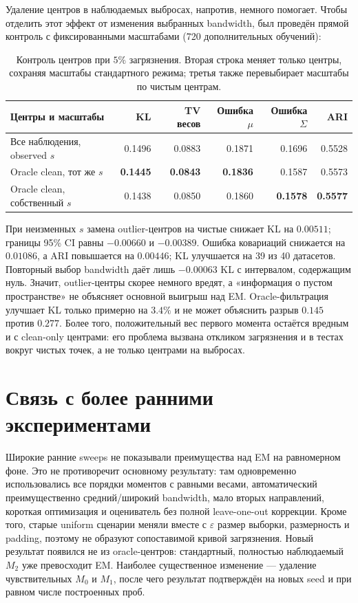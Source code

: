 \documentclass[11pt,a4paper]{article}
\newcommand{\best}[1]{\textbf{\color{green}#1}}
\newcommand{\Mzero}{M_0}
\newcommand{\Mone}{M_1}
\newcommand{\Mtwo}{M_2}
\begin{document}
Удаление центров в наблюдаемых выбросах, напротив, немного помогает. Чтобы
отделить этот эффект от изменения выбранных bandwidth, был проведён прямой
контроль с фиксированными масштабами (720 дополнительных обучений):

\begin{table}[ht]
\centering
\small
\caption{Контроль центров при $5\%$ загрязнения. Вторая строка меняет только
центры, сохраняя масштабы стандартного режима; третья также перевыбирает
масштабы по чистым центрам.}
\label{tab:centers}
\begin{tabularx}{\linewidth}{@{}Yrrrrr@{}}
\toprule
Центры и масштабы & KL & TV весов & Ошибка $\mu$ & Ошибка $\Sigma$ & ARI \\
\midrule
Все наблюдения, observed $s$ & 0.1496 & 0.0883 & 0.1871 & 0.1696 & 0.5528 \\
Oracle clean, тот же $s$ & \best{0.1445} & \best{0.0843} & \best{0.1836} & 0.1587 & 0.5573 \\
Oracle clean, собственный $s$ & 0.1438 & 0.0850 & 0.1860 & \best{0.1578} & \best{0.5577} \\
\bottomrule
\end{tabularx}
\end{table}

При неизменных $s$ замена outlier-центров на чистые снижает KL на $0.00511$;
границы 95\% CI равны $-0.00660$ и $-0.00389$. Ошибка ковариаций снижается
на $0.01086$,
а ARI повышается на
$0.00446$; KL улучшается на 39 из 40 датасетов. Повторный выбор bandwidth
даёт лишь $-0.00063$ KL с интервалом, содержащим нуль. Значит, outlier-центры
скорее немного вредят, а «информация о пустом пространстве» не объясняет
основной выигрыш над EM. Oracle-фильтрация улучшает KL только примерно на
$3.4\%$ и не может объяснить разрыв $0.145$ против $0.277$. Более того,
положительный вес первого момента остаётся вредным и с clean-only центрами:
его проблема вызвана откликом загрязнения и в тестах вокруг чистых точек, а не
только центрами на выбросах.

\section{Связь с более ранними экспериментами}

Широкие ранние sweeps не показывали преимущества над EM на равномерном фоне.
Это не противоречит основному результату: там одновременно использовались все
порядки моментов с равными весами, автоматический преимущественно
средний/широкий bandwidth, мало вторых направлений, короткая оптимизация и
оцениватель без полной leave-one-out коррекции. Кроме того, старые uniform
сценарии меняли вместе с $\varepsilon$ размер выборки, размерность и padding,
поэтому не образуют сопоставимой кривой загрязнения. Новый результат появился
не из oracle-центров: стандартный, полностью наблюдаемый $\Mtwo$ уже
превосходит EM. Наиболее существенное изменение --- удаление чувствительных
$\Mzero$ и $\Mone$, после чего результат подтверждён на новых seed и при
равном числе построенных проб.
\end{document}
